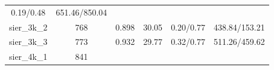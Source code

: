 \documentclass[]{article}
\begin{document}
\begin{longtable}[]{@{}cccccc@{}}
\begin{minipage}[t]{0.17\columnwidth}
0.19/0.48\strut
\end{minipage} & \begin{minipage}[t]{0.22\columnwidth}\centering\strut
651.46/850.04\strut
\end{minipage}\tabularnewline
\begin{minipage}[t]{0.12\columnwidth}\centering\strut
sier\_3k\_2\strut
\end{minipage} & \begin{minipage}[t]{0.07\columnwidth}\centering\strut
768\strut
\end{minipage} & \begin{minipage}[t]{0.12\columnwidth}\centering\strut
0.898\strut
\end{minipage} & \begin{minipage}[t]{0.14\columnwidth}\centering\strut
30.05\strut
\end{minipage} & \begin{minipage}[t]{0.17\columnwidth}\centering\strut
0.20/0.77\strut
\end{minipage} & \begin{minipage}[t]{0.22\columnwidth}\centering\strut
438.84/153.21\strut
\end{minipage}\tabularnewline
\begin{minipage}[t]{0.12\columnwidth}\centering\strut
sier\_3k\_3\strut
\end{minipage} & \begin{minipage}[t]{0.07\columnwidth}\centering\strut
773\strut
\end{minipage} & \begin{minipage}[t]{0.12\columnwidth}\centering\strut
0.932\strut
\end{minipage} & \begin{minipage}[t]{0.14\columnwidth}\centering\strut
29.77\strut
\end{minipage} & \begin{minipage}[t]{0.17\columnwidth}\centering\strut
0.32/0.77\strut
\end{minipage} & \begin{minipage}[t]{0.22\columnwidth}\centering\strut
511.26/459.62\strut
\end{minipage}\tabularnewline
\begin{minipage}[t]{0.12\columnwidth}\centering\strut
sier\_4k\_1\strut
\end{minipage} & \begin{minipage}[t]{0.07\columnwidth}\centering\strut
841\strut
\end{minipage} & \begin{minipage}[t]{0.12\columnwidth}\centering\strut

\end{minipage}
\end{longtable}
\end{document}
